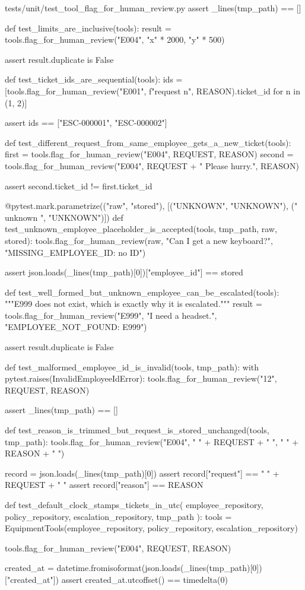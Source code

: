 \documentclass[11pt,letterpaper]{article}
\renewcommand{\_}{\textunderscore\allowbreak}
\begin{document}
\begin{codebox}{tests/unit/test_tool_flag_for_human_review.py}
    assert _lines(tmp_path) == []


def test_limits_are_inclusive(tools):
    result = tools.flag_for_human_review("E004", "x" * 2000, "y" * 500)

    assert result.duplicate is False


def test_ticket_ids_are_sequential(tools):
    ids = [tools.flag_for_human_review("E001", f"request {n}", REASON).ticket_id for n in (1, 2)]

    assert ids == ["ESC-000001", "ESC-000002"]


def test_different_request_from_same_employee_gets_a_new_ticket(tools):
    first = tools.flag_for_human_review("E004", REQUEST, REASON)
    second = tools.flag_for_human_review("E004", REQUEST + " Please hurry.", REASON)

    assert second.ticket_id != first.ticket_id


@pytest.mark.parametrize(("raw", "stored"), [("UNKNOWN", "UNKNOWN"), (" unknown ", "UNKNOWN")])
def test_unknown_employee_placeholder_is_accepted(tools, tmp_path, raw, stored):
    tools.flag_for_human_review(raw, "Can I get a new keyboard?", "MISSING_EMPLOYEE_ID: no ID")

    assert json.loads(_lines(tmp_path)[0])["employee_id"] == stored


def test_well_formed_but_unknown_employee_can_be_escalated(tools):
    """E999 does not exist, which is exactly why it is escalated."""
    result = tools.flag_for_human_review("E999", "I need a headset.", "EMPLOYEE_NOT_FOUND: E999")

    assert result.duplicate is False


def test_malformed_employee_id_is_invalid(tools, tmp_path):
    with pytest.raises(InvalidEmployeeIdError):
        tools.flag_for_human_review("12", REQUEST, REASON)

    assert _lines(tmp_path) == []


def test_reason_is_trimmed_but_request_is_stored_unchanged(tools, tmp_path):
    tools.flag_for_human_review("E004", "  " + REQUEST + "  ", "  " + REASON + "  ")

    record = json.loads(_lines(tmp_path)[0])
    assert record["request"] == "  " + REQUEST + "  "
    assert record["reason"] == REASON


def test_default_clock_stamps_tickets_in_utc(
    employee_repository, policy_repository, escalation_repository, tmp_path
):
    tools = EquipmentTools(employee_repository, policy_repository, escalation_repository)

    tools.flag_for_human_review("E004", REQUEST, REASON)

    created_at = datetime.fromisoformat(json.loads(_lines(tmp_path)[0])["created_at"])
    assert created_at.utcoffset() == timedelta(0)
\end{codebox}
\end{document}
